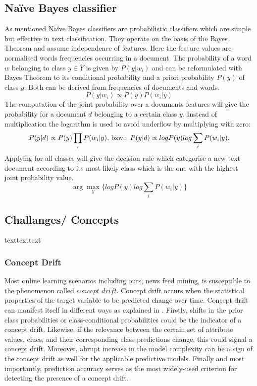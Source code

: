 \documentclass[12pt]{article}
\begin{document}
\subsection{Na\"ive Bayes classifier}

As mentioned Na\"ive Bayes classifiers are probabilistic classifiers which are simple but effective in text classification. They operate on the basis of the Bayes Theorem and assume independence of features. Here the feature values are normalised  words frequencies occurring in a document. The probability of a word $w$ belonging to class $y \in Y$ is given by $P(y|w_i)$ and can be reformulated with Bayes Theorem to its conditional probability and a priori probability $ P(y)$ of class $y$. Both can be derived from frequencies of documents and words.
$$
P(y|w_i) \propto P(y)P(w_i|y)
$$
The computation of the joint probability over a documents features will give the probability for a  document $d$ belonging to a certain class $y$. Instead of multiplication the logarithm is used to avoid underflow by multiplying with zero:
$$
P(y|d) \propto P(y)\prod_i P(w_i|y)\space
\textrm{,  bzw.:    }
P(y|d) \propto log P(y) log \sum_i P(w_i|y),
$$
Applying for all classes will give the decision rule which categorise a new text document according to its most likely class which is the one with the highest joint probability value.
$$
\arg\max_y\{ log P(y) log \sum_i P(w_i|y)\}
$$

\subsection{Challanges/ Concepts}
texttexttext

\subsubsection{Concept Drift}
Most online learning scenarios including ours, news feed mining, is susceptible to the phenomenon called $concept$ $drift$. Concept drift occurs when the statistical properties of the target variable to be predicted change over time. Concept drift can manifest itself in different ways as explained in \citep[p. 5]{KunchevaEnsembleOverview08} . Firstly, shifts in the prior class probabilities or class-conditional probabilities could be the indicator of a concept drift. Likewise, if the relevance between the certain set of attribute values, clues, and their corresponding class predictions change, this could signal a concept drift. Moreover, abrupt increase in the model complexity can be a sign of the concept drift as well for the applicable predictive models. Finally and most importantly, prediction accuracy serves as the most widely-used criterion for detecting the presence of a concept drift. 
\end{document}
